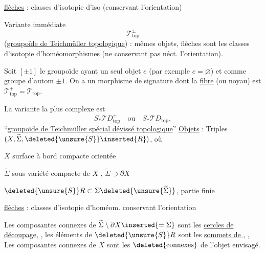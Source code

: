 \uline{flèches} : classes d'isotopie d'iso (conservant l'orientation)


Variante immédiate
\[
\mathcal T_{\mathrm{top}}^\pm
\]
(\uline{groupoïde de Teichmüller  topologique}) :
mêmes objets, flèches sont les classes d'isotopie d'homéomorphismes
(ne conservant pas néct. l'orientation).

Soit $[\pm1]$ le groupoïde ayant un seul objet $e$ (par exemple $e=\varnothing$)
et comme groupe d'autom $\pm1$. On a un morphisme de signature
dont la \uline{fibre}  (ou noyau) est
$\mathcal T_{\mathrm{top}}^+=\mathcal T_{\mathrm{top}}$.

La variante la plus complexe est
\[
S_*\mathcal TD_{\mathrm{top}}^+\quad\text{ou}\quad
S_*\mathcal TD_{\mathrm{top}},
\]
``\uline{groupoïde de Teichmüller  spécial dévissé topologique}''
\uline{Objets} : Triples $(X,\widetilde\Sigma,
\deleted{\unsure{S}}\inserted{R})$, où

$X$ surface à bord compacte orientée

$\widetilde\Sigma$ sous-variété compacte de $X$
, $\widetilde\Sigma\supset\partial X$

$\deleted{\unsure{S}}R\subset\Sigma\deleted{\unsure{\widetilde\Sigma}}$,
partie finie


\uline{flèches} : classes d'isotopie d'homéom. conservant l'orientation

Les composantes connexes de $\widetilde\Sigma\setminus\partial X
\inserted{=\Sigma}$ sont les \uline{cercles de découpage},
,
les éléments de $\deleted{\unsure{S}}R$ sont les
 \uline{sommets de
},
,
Les composantes connexes de $X$ sont les
$\deleted{\text{connexes}}$
de l'objet envisagé.


